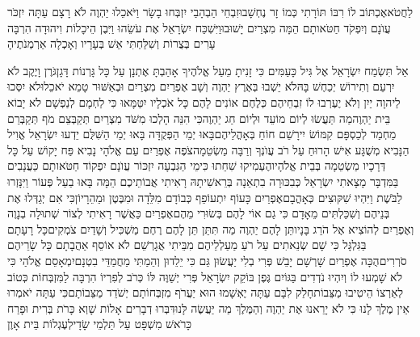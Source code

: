 \documentclass[../main/main.tex]{subfiles}
\begin{document}
\begin{multicols}{\ncols}
לַחֲטֹא\PreVerseSpace{}אֶכְתּוֹב לוֹ רִבּוֹ תּוֹרָתִי כְּמוֹ זָר נֶחְשָׁבוּ\PreVerseSpace{}זִבְחֵי הַבְהָבַי יִזְבְּחוּ בָשָׂר וַיֹּאכֵלוּ יַהְוֶה לֹא רָצָם עַתָּה יִזְכֹּר עֲוֺנָם וְיִפְקֹד חַטֹּאותָם הֵמָּה מִצְרַיִם יָשׁוּבוּ\PreVerseSpace{}וַיִּשְׁכַּח יִשְׂרָאֵל אֶת עֹשֵׂהוּ וַיִּבֶן הֵיכָלוֹת וִיהוּדָה הִרְבָּה עָרִים בְּצֻרוֹת וְשִׁלַּחְתִּי אֵשׁ בְּעָרָיו וְאָכְלָה אַרְמְנֹתֶיהָ\OpenSection{}\par
{}אַל תִּשְׂמַח יִשְׂרָאֵל אֶל גִּיל כָּעַמִּים כִּי זָנִיתָ מֵעַל אֱלֹהֶיךָ אָהַבְתָּ אֶתְנָן עַל כָּל גָּרְנוֹת דָּגָן\PreVerseSpace{}גֹּרֶן וָיֶקֶב לֹא יִרְעֵם וְתִירוֹשׁ יְכַחֶשׁ בָּהּ\PreVerseSpace{}לֹא יֵשְׁבוּ בְּאֶרֶץ יַהְוֶה וְשָׁב אֶפְרַיִם מִצְרַיִם וּבְאַשּׁוּר טָמֵא יֹאכֵלוּ\PreVerseSpace{}לֹא יִסְּכוּ לַיהוָה יַיִן וְלֹא יֶעֶרְבוּ לוֹ זִבְחֵיהֶם כְּלֶחֶם אוֹנִים לָהֶם כָּל אֹכְלָיו יִטַּמָּאוּ כִּי לַחְמָם לְנַפְשָׁם לֹא יָבוֹא בֵּית יַהְוֶה\PreVerseSpace{}מַה תַּעֲשׂוּ לְיוֹם מוֹעֵד וּלְיוֹם חַג יַהְוֶה\PreVerseSpace{}כִּי הִנֵּה הָלְכוּ מִשֹּׁד מִצְרַיִם תְּקַבְּצֵם מֹף תְּקַבְּרֵם מַחְמַד לְכַסְפָּם קִמּוֹשׂ יִירָשֵׁם חוֹחַ בְּאָהֳלֵיהֶם\PreVerseSpace{}בָּאוּ יְמֵי הַפְּקֻדָּה בָּאוּ יְמֵי הַשִּׁלֻּם יֵדְעוּ יִשְׂרָאֵל אֱוִיל הַנָּבִיא מְשֻׁגָּע אִישׁ הָרוּחַ עַל רֹב עֲוֺנְךָ וְרַבָּה מַשְׂטֵמָה\PreVerseSpace{}צֹפֶה אֶפְרַיִם עַם\SubEnd{} אֱלֹהָי נָבִיא פַּח יָקוֹשׁ עַל כָּל דְּרָכָיו מַשְׂטֵמָה בְּבֵית אֱלֹהָיו\PreVerseSpace{}הֶעְמִיקוּ שִׁחֵתוּ כִּימֵי הַגִּבְעָה יִזְכּוֹר עֲוֺנָם יִפְקוֹד חַטֹּאותָם \ClosedSection{}כַּעֲנָבִים בַּמִּדְבָּר מָצָאתִי יִשְׂרָאֵל כְּבִכּוּרָה בִתְאֵנָה בְּרֵאשִׁיתָהּ רָאִיתִי אֲבוֹתֵיכֶם הֵמָּה בָּאוּ בַעַל פְּעוֹר וַיִּנָּזְרוּ לַבֹּשֶׁת וַיִּהְיוּ שִׁקּוּצִים כְּאָהֳבָם\PreVerseSpace{}אֶפְרַיִם כָּעוֹף יִתְעוֹפֵף כְּבוֹדָם מִלֵּדָה וּמִבֶּטֶן וּמֵהֵרָיוֹן\PreVerseSpace{}כִּי אִם יְגַדְּלוּ אֶת בְּנֵיהֶם וְשִׁכַּלְתִּים מֵאָדָם כִּי גַם אוֹי לָהֶם בְּשׂוּרִי מֵהֶם\PreVerseSpace{}אֶפְרַיִם כַּאֲשֶׁר רָאִיתִי לְצוֹר שְׁתוּלָה בְנָוֶה וְאֶפְרַיִם לְהוֹצִיא אֶל הֹרֵג בָּנָיו\PreVerseSpace{}תֵּן לָהֶם יַהְוֶה מַה תִּתֵּן תֵּן לָהֶם רֶחֶם מַשְׁכִּיל וְשָׁדַיִם צֹמְקִים\PreVerseSpace{}כָּל רָעָתָם בַּגִּלְגָּל כִּי שָׁם שְׂנֵאתִים עַל רֹעַ מַעַלְלֵיהֶם מִבֵּיתִי אֲגָרְשֵׁם לֹא אוֹסֵף אַהֲבָתָם כָּל שָׂרֵיהֶם סֹרְרִים\PreVerseSpace{}הֻכָּה אֶפְרַיִם שָׁרְשָׁם יָבֵשׁ פְּרִי בְלִי יַעֲשׂוּן גַּם כִּי יֵלֵדוּן וְהֵמַתִּי מַחֲמַדֵּי בִטְנָם\PreVerseSpace{}יִמְאָסֵם אֱלֹהַי כִּי לֹא שָׁמְעוּ לוֹ וְיִהְיוּ נֹדְדִים בַּגּוֹיִם \ClosedSection{}גֶּפֶן בּוֹקֵק יִשְׂרָאֵל פְּרִי יְשַׁוֶּה לּוֹ כְּרֹב לְפִרְיוֹ הִרְבָּה לַמִּזְבְּחוֹת כְּטוֹב לְאַרְצוֹ הֵיטִיבוּ מַצֵּבוֹת\PreVerseSpace{}חָלַק לִבָּם עַתָּה יֶאְשָׁמוּ הוּא יַעֲרֹף מִזְבְּחוֹתָם יְשֹׁדֵד מַצֵּבוֹתָם\PreVerseSpace{}כִּי עַתָּה יֹאמְרוּ אֵין מֶלֶךְ לָנוּ כִּי לֹא יָרֵאנוּ אֶת יַהְוֶה וְהַמֶּלֶךְ מַה יַּעֲשֶׂה לָּנוּ\PreVerseSpace{}דִּבְּרוּ דְבָרִים אָלוֹת שָׁוְא כָּרֹת בְּרִית וּפָרַח כָּרֹאשׁ מִשְׁפָּט עַל תַּלְמֵי שָׂדָי\PreVerseSpace{}לְעֶגְלוֹת בֵּית אָוֶן 
\end{multicols}
\end{document}
